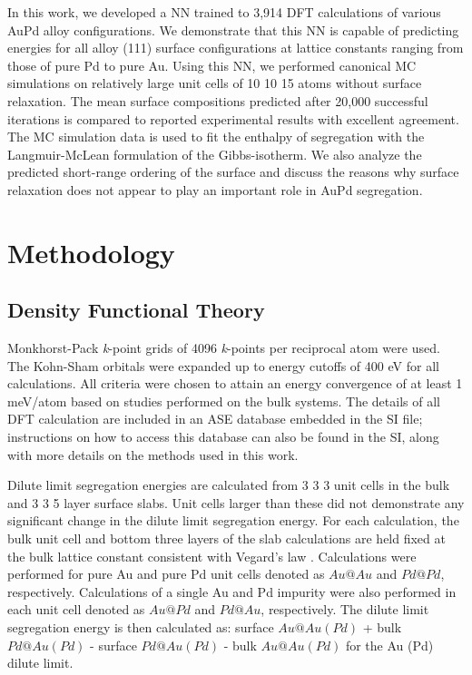 \documentclass[12pt]{cmuthesis}
\begin{document}
In this work, we developed a NN trained to 3,914 DFT calculations of various AuPd alloy configurations. We demonstrate that this NN is capable of predicting energies for all alloy (111) surface configurations at lattice constants ranging from those of pure Pd to pure Au. Using this NN, we performed canonical MC simulations on relatively large unit cells of 10 \texttimes{} 10 \texttimes{} 15 atoms without surface relaxation. The mean surface compositions predicted after 20,000 successful iterations is compared to reported experimental results with excellent agreement. The MC simulation data is used to fit the enthalpy of segregation with the Langmuir-McLean formulation of the Gibbs-isotherm. We also analyze the predicted short-range ordering of the surface and discuss the reasons why surface relaxation does not appear to play an important role in AuPd segregation.

\section{Methodology}
\label{sec:orgfaa8fd0}
\subsection{Density Functional Theory}
\label{sec:org2590fcc}
Monkhorst-Pack \emph{k}-point grids \cite{monkhorst-1976-special-point} of 4096 \emph{k}-points per reciprocal atom were used. The Kohn-Sham orbitals were expanded up to energy cutoffs of 400 eV for all calculations. All criteria were chosen to attain an energy convergence of at least 1 meV/atom based on studies performed on the bulk systems. The details of all DFT calculation are included in an ASE database embedded in the SI file; instructions on how to access this database can also be found in the SI, along with more details on the methods used in this work.

Dilute limit segregation energies are calculated from 3 \texttimes{} 3 \texttimes{} 3 unit cells in the bulk and 3 \texttimes{} 3 \texttimes{} 5 layer surface slabs. Unit cells larger than these did not demonstrate any significant change in the dilute limit segregation energy. For each calculation, the bulk unit cell and bottom three layers of the slab calculations are held fixed at the bulk lattice constant consistent with Vegard's law \cite{denton-1991-vegar-law}. Calculations were performed for pure Au and pure Pd unit cells denoted as \(Au@Au\) and \(Pd@Pd\), respectively. Calculations of a single Au and Pd impurity were also performed in each unit cell denoted as \(Au@Pd\) and \(Pd@Au\), respectively. The dilute limit segregation energy is then calculated as: surface \(Au@Au(Pd)\) + bulk \(Pd@Au(Pd)\) - surface \(Pd@Au(Pd)\) - bulk \(Au@Au(Pd)\) for the Au (Pd) dilute limit.
\end{document}
